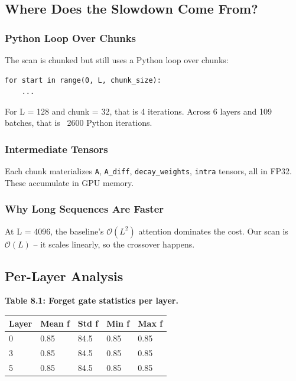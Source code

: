 \subsection{Where Does the Slowdown Come From?}

\subsubsection{Python Loop Over Chunks}

The scan is chunked but still uses a Python loop over chunks:

\begin{lstlisting}
for start in range(0, L, chunk_size):
    ...
\end{lstlisting}

For L = 128 and chunk = 32, that is 4 iterations. Across 6 layers and 109 
batches, that is ~2600 Python iterations.

\subsubsection{Intermediate Tensors}

Each chunk materializes \texttt{A}, \texttt{A\_diff}, \texttt{decay\_weights}, \texttt{intra} tensors, all 
in FP32. These accumulate in GPU memory.

\subsubsection{Why Long Sequences Are Faster}

At L = 4096, the baseline's $\mathcal{O}(L^2)$ attention dominates the cost. 
Our scan is $\mathcal{O}(L)$ -- it scales linearly, so the crossover happens.

\subsection{Per-Layer Analysis}

\textbf{Table 8.1: Forget gate statistics per layer.}

\begin{table}[H]
\centering
\small
\begin{tabular}{lllll}
\toprule
\textbf{Layer} & \textbf{Mean f} & \textbf{Std f} & \textbf{Min f} & \textbf{Max f} \\
\midrule
0 & 0.85 & 84.5 & 0.85 & 0.85 \\
3 & 0.85 & 84.5 & 0.85 & 0.85 \\
5 & 0.85 & 84.5 & 0.85 & 0.85 \\
\bottomrule
\end{tabular}
\end{table}

